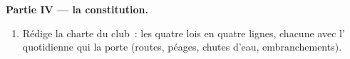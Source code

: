 \begin{problem}
\medskip\noindent\textbf{Partie IV --- la constitution.}
\begin{enumerate}[resume]
  \item Rédige la charte du club~: les quatre lois en quatre lignes,
        chacune avec l' quotidienne qui la porte (routes,
        péages, chutes d'eau, embranchements).
\end{enumerate}
\end{problem}
